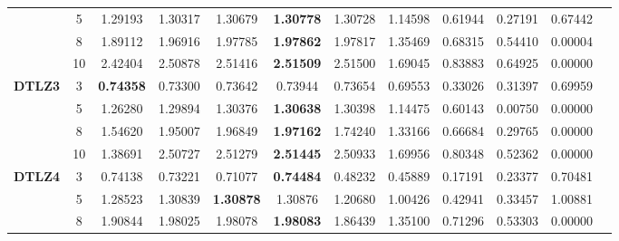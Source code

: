\documentclass{sig-alternate}
\begin{document}
\begin{table}[!htb]
\begin{tabular}{|c|c|c|c|c|c|c|c|c|c|c|c|}
& 5          & 1.29193          & 1.30317           & 1.30679               & \textbf{1.30778} & 1.30728             & 1.14598             & 0.61944            & 0.27191              & 0.67442          \\ \cline{2-11} 
& 8          & 1.89112          & 1.96916           & 1.97785               & \textbf{1.97862} & 1.97817             & 1.35469             & 0.68315            & 0.54410              & 0.00004          \\ \cline{2-11} 
& 10         & 2.42404          & 2.50878           & 2.51416               & \textbf{2.51509} & 2.51500             & 1.69045             & 0.83883            & 0.64925              & 0.00000          \\ \hline
\multirow{4}{*}{\textbf{DTLZ3}} & 3          & \textbf{0.74358} & 0.73300           & 0.73642               & 0.73944          & 0.73654             & 0.69553             & 0.33026            & 0.31397              & 0.69959          \\ \cline{2-11} 
& 5          & 1.26280          & 1.29894           & 1.30376               & \textbf{1.30638} & 1.30398             & 1.14475             & 0.60143            & 0.00750              & 0.00000          \\ \cline{2-11} 
& 8          & 1.54620          & 1.95007           & 1.96849               & \textbf{1.97162} & 1.74240             & 1.33166             & 0.66684            & 0.29765              & 0.00000          \\ \cline{2-11} 
& 10         & 1.38691          & 2.50727           & 2.51279               & \textbf{2.51445} & 2.50933             & 1.69956             & 0.80348            & 0.52362              & 0.00000          \\ \hline
\multirow{4}{*}{\textbf{DTLZ4}} & 3          & 0.74138          & 0.73221           & 0.71077               & \textbf{0.74484} & 0.48232             & 0.45889             & 0.17191            & 0.23377              & 0.70481          \\ \cline{2-11} 
& 5          & 1.28523          & 1.30839           & \textbf{1.30878}      & 1.30876          & 1.20680             & 1.00426             & 0.42941            & 0.33457              & 1.00881          \\ \cline{2-11} 
& 8          & 1.90844          & 1.98025           & 1.98078               & \textbf{1.98083} & 1.86439             & 1.35100             & 0.71296            & 0.53303              & 0.00000          \\ \cline{2-11} 

\end{tabular}
\end{table}
\end{document}
